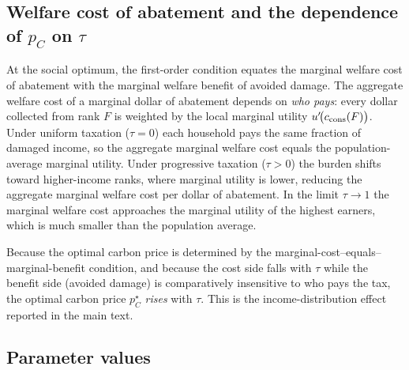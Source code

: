 \subsection*{Welfare cost of abatement and the dependence of $p_C$ on $\tau$}\label{si:welfarecost}

At the social optimum, the first-order condition equates the marginal welfare cost of abatement with the marginal welfare benefit of avoided damage.  The aggregate welfare cost of a marginal dollar of abatement depends on \emph{who pays}: every dollar collected from rank $F$ is weighted by the local marginal utility $u'\!\bigl(c_{\rm cons}(F)\bigr)$.  Under uniform taxation ($\tau = 0$) each household pays the same fraction of damaged income, so the aggregate marginal welfare cost equals the population-average marginal utility.  Under progressive taxation ($\tau > 0$) the burden shifts toward higher-income ranks, where marginal utility is lower, reducing the aggregate marginal welfare cost per dollar of abatement.  In the limit $\tau \to 1$ the marginal welfare cost approaches the marginal utility of the highest earners, which is much smaller than the population average.

Because the optimal carbon price is determined by the marginal-cost--equals--marginal-benefit condition, and because the cost side falls with $\tau$ while the benefit side (avoided damage) is comparatively insensitive to who pays the tax, the optimal carbon price $p_C^{\star}$ \emph{rises} with $\tau$.  This is the income-distribution effect reported in the main text.

\subsection*{Parameter values}\label{si:params}

